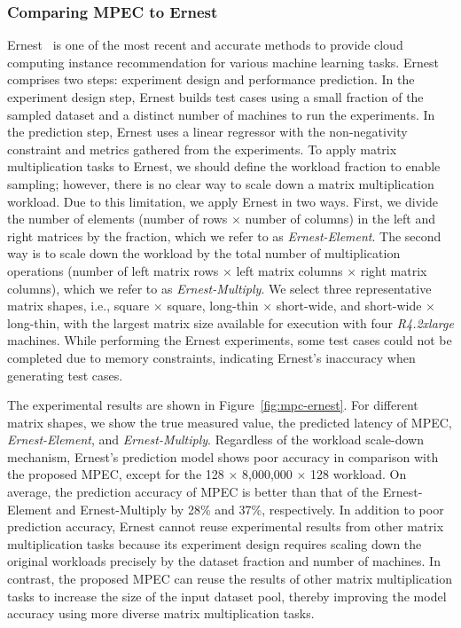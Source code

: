 \documentclass[10pt, conference, compsocconf]{IEEEtran}
\begin{document}
\subsubsection{Comparing MPEC to Ernest}
Ernest~\cite{ernest} is one of the most recent and accurate methods to provide cloud computing instance recommendation for various machine learning tasks. Ernest comprises two steps: experiment design and performance prediction. In the experiment design step, Ernest builds test cases using a small fraction of the sampled dataset and a distinct number of machines to run the experiments. In the prediction step, Ernest uses a linear regressor with the non-negativity constraint and metrics gathered from the experiments. To apply matrix multiplication tasks to Ernest, we should define the workload fraction to enable sampling; however, there is no clear way to scale down a matrix multiplication workload. Due to this limitation, we apply Ernest in two ways. First, we divide the number of elements (number of rows $\times$ number of columns) in the left and right matrices by the fraction, which we refer to as \textit{Ernest-Element}. The second way is to scale down the workload by the total number of multiplication operations (number of left matrix rows $\times$ left matrix columns $\times$ right matrix columns), which we refer to as \textit{Ernest-Multiply}. We select three representative matrix shapes, i.e., square $\times$ square, long-thin $\times$ short-wide, and short-wide $\times$ long-thin, with the largest matrix size available for execution with four \textit{R4.2xlarge} machines. While performing the Ernest experiments, some test cases could not be completed due to memory constraints, indicating Ernest's inaccuracy when generating test cases.

The experimental results are shown in Figure~\ref{fig:mpc-ernest}. For different matrix shapes, we show the true measured value, the predicted latency of MPEC, \textit{Ernest-Element}, and \textit{Ernest-Multiply}. Regardless of the workload scale-down mechanism, Ernest's prediction model shows poor accuracy in comparison with the proposed MPEC, except for the 128 $\times$ 8,000,000 $\times$ 128 workload. On average, the prediction accuracy of MPEC is better than that of the Ernest-Element and Ernest-Multiply by 28\% and 37\%, respectively. In addition to poor prediction accuracy, Ernest cannot reuse experimental results from other matrix multiplication tasks because its experiment design requires scaling down the original workloads precisely by the dataset fraction and number of machines. In contrast, the proposed MPEC can reuse the results of other matrix multiplication tasks to increase the size of the input dataset pool, thereby improving the model accuracy using more diverse matrix multiplication tasks.
\end{document}

